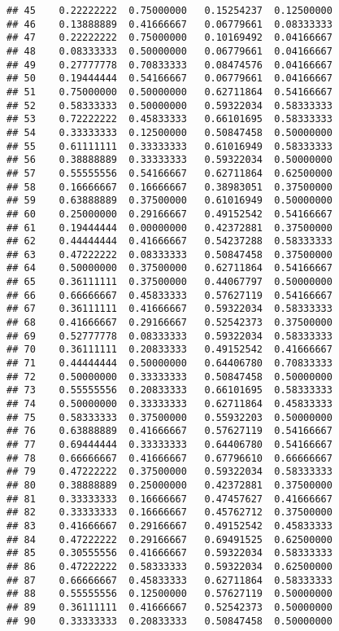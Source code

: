 \documentclass[
]{article}
\begin{document}
\begin{verbatim}
## 45    0.22222222  0.75000000   0.15254237  0.12500000
## 46    0.13888889  0.41666667   0.06779661  0.08333333
## 47    0.22222222  0.75000000   0.10169492  0.04166667
## 48    0.08333333  0.50000000   0.06779661  0.04166667
## 49    0.27777778  0.70833333   0.08474576  0.04166667
## 50    0.19444444  0.54166667   0.06779661  0.04166667
## 51    0.75000000  0.50000000   0.62711864  0.54166667
## 52    0.58333333  0.50000000   0.59322034  0.58333333
## 53    0.72222222  0.45833333   0.66101695  0.58333333
## 54    0.33333333  0.12500000   0.50847458  0.50000000
## 55    0.61111111  0.33333333   0.61016949  0.58333333
## 56    0.38888889  0.33333333   0.59322034  0.50000000
## 57    0.55555556  0.54166667   0.62711864  0.62500000
## 58    0.16666667  0.16666667   0.38983051  0.37500000
## 59    0.63888889  0.37500000   0.61016949  0.50000000
## 60    0.25000000  0.29166667   0.49152542  0.54166667
## 61    0.19444444  0.00000000   0.42372881  0.37500000
## 62    0.44444444  0.41666667   0.54237288  0.58333333
## 63    0.47222222  0.08333333   0.50847458  0.37500000
## 64    0.50000000  0.37500000   0.62711864  0.54166667
## 65    0.36111111  0.37500000   0.44067797  0.50000000
## 66    0.66666667  0.45833333   0.57627119  0.54166667
## 67    0.36111111  0.41666667   0.59322034  0.58333333
## 68    0.41666667  0.29166667   0.52542373  0.37500000
## 69    0.52777778  0.08333333   0.59322034  0.58333333
## 70    0.36111111  0.20833333   0.49152542  0.41666667
## 71    0.44444444  0.50000000   0.64406780  0.70833333
## 72    0.50000000  0.33333333   0.50847458  0.50000000
## 73    0.55555556  0.20833333   0.66101695  0.58333333
## 74    0.50000000  0.33333333   0.62711864  0.45833333
## 75    0.58333333  0.37500000   0.55932203  0.50000000
## 76    0.63888889  0.41666667   0.57627119  0.54166667
## 77    0.69444444  0.33333333   0.64406780  0.54166667
## 78    0.66666667  0.41666667   0.67796610  0.66666667
## 79    0.47222222  0.37500000   0.59322034  0.58333333
## 80    0.38888889  0.25000000   0.42372881  0.37500000
## 81    0.33333333  0.16666667   0.47457627  0.41666667
## 82    0.33333333  0.16666667   0.45762712  0.37500000
## 83    0.41666667  0.29166667   0.49152542  0.45833333
## 84    0.47222222  0.29166667   0.69491525  0.62500000
## 85    0.30555556  0.41666667   0.59322034  0.58333333
## 86    0.47222222  0.58333333   0.59322034  0.62500000
## 87    0.66666667  0.45833333   0.62711864  0.58333333
## 88    0.55555556  0.12500000   0.57627119  0.50000000
## 89    0.36111111  0.41666667   0.52542373  0.50000000
## 90    0.33333333  0.20833333   0.50847458  0.50000000

\end{verbatim}
\end{document}
